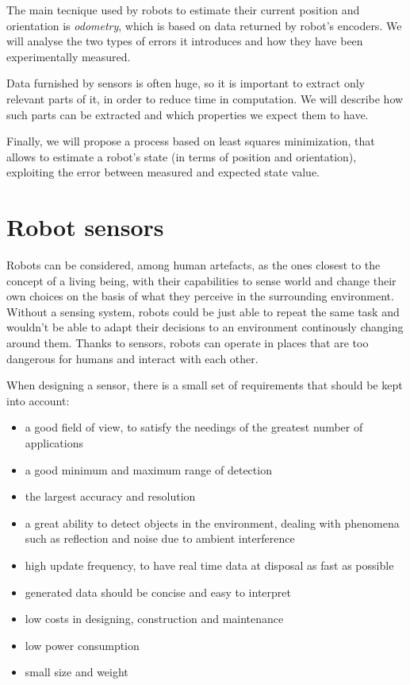 \documentclass[a4paper, onecolumn]{report}
\begin{document}
The main tecnique used by robots to estimate their current position and orientation is \emph{odometry}, which is based on data returned by robot's encoders. We will analyse the two types of errors it introduces and how they have been experimentally measured.

Data furnished by sensors is often huge, so it is important to extract only relevant parts of it, in order to reduce time in computation. We will describe how such parts can be extracted and which properties we expect them to have.

Finally, we will propose a process based on least squares minimization, that allows to estimate a robot's state (in terms of position and orientation), exploiting the error between measured and expected state value.

\section{Robot sensors}
Robots can be considered, among human artefacts, as the ones closest to the concept of a living being, with their capabilities to sense world and change their own choices on the basis of what they perceive in the surrounding environment. Without a sensing system, robots could be just able to repeat the same task and wouldn't be able to adapt their decisions to an environment continously changing around them. Thanks to sensors, robots can operate in places that are too dangerous for humans and interact with each other. 

When designing a sensor, there is a small set of requirements that should be kept into account:
\begin{itemize}
\item{a good field of view, to satisfy the needings of the greatest number of applications}
\item{a good minimum and maximum range of detection}
\item{the largest accuracy and resolution}
\item{a great ability to detect objects in the environment, dealing with phenomena such as reflection and noise due to ambient interference}
\item{high update frequency, to have real time data at disposal as fast as possible}
\item{generated data should be concise and easy to interpret}
\item{low costs in designing, construction and maintenance}
\item{low power consumption}
\item{small size and weight}
\end{itemize}
\end{document}
